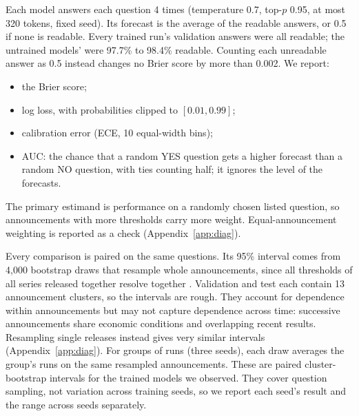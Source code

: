 \documentclass[11pt]{article}
\begin{document}
Each model answers each question 4 times (temperature 0.7, top-$p$ 0.95, at most 320 tokens, fixed seed). Its forecast is the average of the readable answers, or 0.5 if none is readable. Every trained run's validation answers were all readable; the untrained models' were 97.7\% to 98.4\% readable. Counting each unreadable answer as 0.5 instead changes no Brier score by more than 0.002. We report:
\begin{itemize}[leftmargin=*]
\item the Brier score;
\item log loss, with probabilities clipped to $[0.01, 0.99]$;
\item calibration error (ECE, 10 equal-width bins);
\item AUC: the chance that a random YES question gets a higher forecast than a random NO question, with ties counting half; it ignores the level of the forecasts.
\end{itemize}
The primary estimand is performance on a randomly chosen listed question, so announcements with more thresholds carry more weight. Equal-announcement weighting is reported as a check (Appendix~\ref{app:diag}).

Every comparison is paired on the same questions. Its 95\% interval comes from 4,000 bootstrap draws that resample whole announcements, since all thresholds of all series released together resolve together \citep{paleka2025pitfalls}. Validation and test each contain 13 announcement clusters, so the intervals are rough. They account for dependence within announcements but may not capture dependence across time: successive announcements share economic conditions and overlapping recent results. Resampling single releases instead gives very similar intervals (Appendix~\ref{app:diag}). For groups of runs (three seeds), each draw averages the group's runs on the same resampled announcements. These are paired cluster-bootstrap intervals for the trained models we observed. They cover question sampling, not variation across training seeds, so we report each seed's result and the range across seeds separately.
\end{document}
